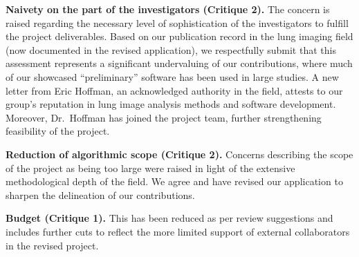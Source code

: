 \documentclass[11pt,]{article}
\begin{document}
\textbf{Naivety on the part of the investigators (Critique 2).} The
concern is raised regarding the necessary level of sophistication of the
investigators to fulfill the project deliverables. Based on our
publication record in the lung imaging field (now documented in the
revised application), we respectfully submit that this assessment
represents a significant undervaluing of our contributions, where much
of our showcased ``preliminary'' software has been used in large
studies. A new letter from Eric Hoffman, an acknowledged authority in
the field, attests to our group's reputation in lung image analysis
methods and software development. Moreover, Dr.~Hoffman has joined the
project team, further strengthening feasibility of the project.

\textbf{Reduction of algorithmic scope (Critique 2).} Concerns
describing the scope of the project as being too large were raised in
light of the extensive methodological depth of the field. We agree and
have revised our application to sharpen the delineation of our
contributions.

\textbf{Budget (Critique 1).} This has been reduced as per review
suggestions and includes further cuts to reflect the more limited
support of external collaborators in the revised project.

\hypertarget{refs}{}
\end{document}
